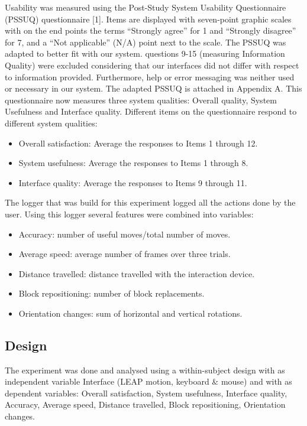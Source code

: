 Usability was measured using the Post-Study System Usability Questionnaire (PSSUQ) questionnaire [1]. Items are displayed with seven-point graphic scales with on the end points the terms “Strongly agree” for 1 and “Strongly disagree” for 7, and a “Not applicable” (N/A) point next to the scale. The PSSUQ was adapted to better fit with our system. questions 9-15 (measuring Information Quality) were excluded considering that our interfaces did not differ with respect to information provided. Furthermore, help or error messaging was neither used or necessary in our system. The adapted PSSUQ is attached in Appendix A. This questionnaire now measures three system qualities: Overall quality, System Usefulness and Interface quality.  Different items on the questionnaire respond to different system qualities:
\begin{itemize}
	\item Overall satisfaction: Average the responses to Items 1 through 12.
	\item System usefulness: Average the responses to Items 1 through 8.
    \item Interface quality: Average the responses to Items 9 through 11.
\end{itemize}

The logger that was build for this experiment logged all the actions done by the user. Using this logger several features were combined into variables: 
\begin{itemize}
	\item Accuracy: number of useful moves/total number of moves.
	\item Average speed: average number of frames over three trials.    
	\item Distance travelled: distance travelled with the interaction device.
    \item Block repositioning: number of block replacements.
    \item Orientation changes: sum of horizontal and vertical rotations.
\end{itemize}


\subsection{Design}
The experiment was done and analysed using a within-subject design with as independent variable Interface (LEAP motion, keyboard \& mouse) and with as dependent variables: Overall satisfaction, System usefulness, Interface quality, Accuracy, Average speed, Distance travelled, Block repositioning, Orientation changes. 


